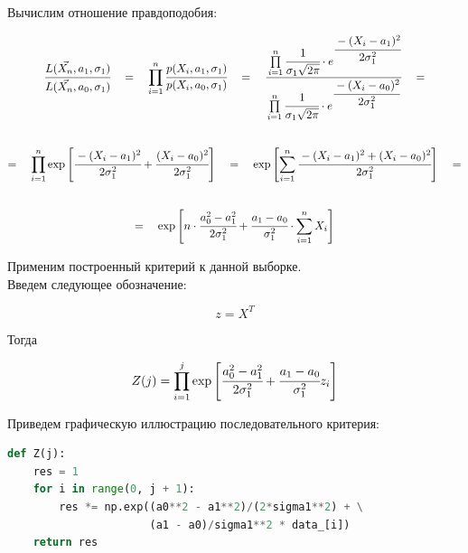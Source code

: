 \documentclass[a4paper, 14pt]{extarticle}
\begin{document}
\newpage

Вычислим отношение правдоподобия:

\begin{gather*}
    \cfrac{L(\vec{X_n}, a_1, \sigma_1)}{L(\vec{X_n}, a_0, \sigma_1)} \hspace{10pt}=\hspace{10pt} 
    \prod_{i=1}^{n} \cfrac{p(X_i, a_1, \sigma_1)}{p(X_i, a_0, \sigma_1)} \hspace{10pt}=\hspace{10pt}
    \cfrac{\prod\limits_{i=1}^n \cfrac{1}{\sigma_1\sqrt{2\pi}} 
    \cdot e^{\cfrac{-(X_i-a_1)^2}{2\sigma^2_1}}}{\prod\limits_{i=1}^n 
    \cfrac{1}{\sigma_1\sqrt{2\pi}} \cdot e^{\cfrac{-(X_i-a_0)^2}{2\sigma^2_1}}} \hspace{10pt} = \\[2em]
    = \hspace{10pt} \prod\limits_{i=1}^n \exp \left[ \cfrac{-(X_i-a_1)^2}{2\sigma^2_1} + 
    \cfrac{(X_i-a_0)^2}{2\sigma^2_1} \right] \hspace{10pt} = \hspace{10pt} 
    \exp \left[\sum\limits_{i=1}^n\cfrac{-(X_i-a_1)^2 + (X_i-a_0)^2}{2\sigma^2_1} \right] \hspace{10pt} = \\[2em]
    = \hspace{10pt} \exp \left[ n \cdot \cfrac{a^2_0 - a^2_1}{2\sigma^2_1} + \cfrac{a_1 - a_0}{\sigma^2_1} 
    \cdot \sum_{i=1}^n X_i \right]
\end{gather*}

Применим построенный критерий к данной выборке. \\
Введем следующее обозначение:

\begin{equation*}
    z = X^T
\end{equation*}

Тогда

\begin{equation*}
    Z(j) = \prod_{i=1}^j \exp \left[ \cfrac{a^2_0 - a^2_1}{2\sigma^2_1} + 
    \cfrac{a_1 - a_0}{\sigma^2_1} z_i \right]
\end{equation*}

Приведем графическую иллюстрацию последовательного критерия: 

\begin{center}
  \begin{lstlisting}[language=Python]
def Z(j):
    res = 1
    for i in range(0, j + 1):
        res *= np.exp((a0**2 - a1**2)/(2*sigma1**2) + \
                      (a1 - a0)/sigma1**2 * data_[i])
    return res
  \end{lstlisting}
\end{center}
\end{document}

